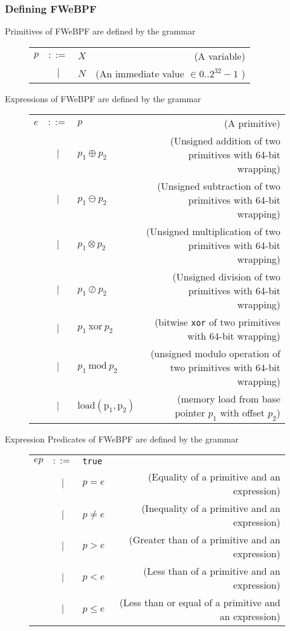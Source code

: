 \subsubsection{Defining FWeBPF}
\label{subsub:fw}

Primitives of FWeBPF are defined by the grammar
\begin{figure}[H]
  \centering
  \begin{tabular}{lclr}
    $p$ & $::=$ & $X$ & (A variable) \\
        & $|$ & $N$ & (An immediate value $\in 0..2^{32}-1$ ) \\
\end{tabular}    
\end{figure}


Expressions of FWeBPF are defined by the grammar
\begin{figure}[H]
  \centering
  \begin{tabular}{lclr}
    $e$ & $::=$ & $p$ & (A primitive) \\
        & $|$ & $p_1 \oplus  p_2$ & (Unsigned addition of two primitives with 64-bit wrapping) \\
      & $|$ & $p_1 \ominus  p_2$ & (Unsigned subtraction of two primitives with 64-bit wrapping) \\        
      & $|$ & $p_1 \otimes p_2$ & (Unsigned multiplication of two primitives with 64-bit wrapping) \\    
      & $|$ & $p_1 \oslash p_2$ & (Unsigned division of two primitives with 64-bit wrapping) \\
        & $|$ & $p_1 ~ \mathrm{xor} ~ p_2$ & (bitwise \texttt{xor} of two primitives with 64-bit wrapping) \\
        & $|$ & $p_1 ~ \mathrm{mod} ~ p_2$ & (unsigned modulo operation of two primitives with 64-bit wrapping) \\    
      & $|$ & $\mathrm{load(p_1,p_2)}$ & (memory load from base pointer $p_1$ with offset $p_2$) \\            
\end{tabular}    
\end{figure}

Expression Predicates of FWeBPF are defined by the grammar
\begin{figure}[H]
  \centering
  \begin{tabular}{lclr}
    $ep$ & $::=$ & \texttt{true} & \\
         & $|$ & $p = e$ & (Equality of a primitive and an expression) \\    
         & $|$ & $p \neq e$ & (Inequality of a primitive and an expression) \\
         & $|$ &  $p > e$ & (Greater than of a primitive and an expression) \\            
         & $|$ &  $p < e$ & (Less than of a primitive and an expression) \\        
         & $|$ &  $p \leq e$ & (Less than or equal of a primitive and an expression) \\
\end{tabular}    
\end{figure}


